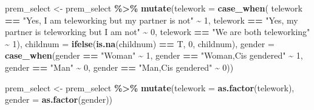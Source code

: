 \documentclass[
]{article}
\newenvironment{Shaded}{\begin{snugshade}}{\end{snugshade}}
\newcommand{\DataTypeTok}[1]{\textcolor[rgb]{0.13,0.29,0.53}{#1}}
\newcommand{\DecValTok}[1]{\textcolor[rgb]{0.00,0.00,0.81}{#1}}
\newcommand{\KeywordTok}[1]{\textcolor[rgb]{0.13,0.29,0.53}{\textbf{#1}}}
\newcommand{\NormalTok}[1]{#1}
\newcommand{\OperatorTok}[1]{\textcolor[rgb]{0.81,0.36,0.00}{\textbf{#1}}}
\newcommand{\StringTok}[1]{\textcolor[rgb]{0.31,0.60,0.02}{#1}}
\begin{document}
\begin{Shaded}
\begin{Highlighting}[]
\NormalTok{prem\_select \textless{}{-}}\StringTok{ }\NormalTok{prem\_select }\OperatorTok{\%\textgreater{}\%}
\StringTok{  }\KeywordTok{mutate}\NormalTok{(}\DataTypeTok{telework =} \KeywordTok{case\_when}\NormalTok{(}
\NormalTok{    telework }\OperatorTok{==}\StringTok{ "Yes, I am teleworking but my partner is not"} \OperatorTok{\textasciitilde{}}\StringTok{ }\DecValTok{1}\NormalTok{,}
\NormalTok{    telework }\OperatorTok{==}\StringTok{ "Yes, my partner is teleworking but I am not"} \OperatorTok{\textasciitilde{}}\StringTok{ }\DecValTok{0}\NormalTok{,}
\NormalTok{    telework }\OperatorTok{==}\StringTok{ "We are both teleworking"} \OperatorTok{\textasciitilde{}}\StringTok{ }\DecValTok{1}\NormalTok{),}
    \DataTypeTok{childnum =} \KeywordTok{ifelse}\NormalTok{(}\KeywordTok{is.na}\NormalTok{(childnum) }\OperatorTok{==}\StringTok{ }\NormalTok{T, }\DecValTok{0}\NormalTok{, childnum),}
    \DataTypeTok{gender =} \KeywordTok{case\_when}\NormalTok{(gender }\OperatorTok{==}\StringTok{ "Woman"} \OperatorTok{\textasciitilde{}}\StringTok{ }\DecValTok{1}\NormalTok{,}
\NormalTok{                       gender }\OperatorTok{==}\StringTok{ "Woman,Cis gendered"} \OperatorTok{\textasciitilde{}}\StringTok{ }\DecValTok{1}\NormalTok{,}
\NormalTok{                       gender }\OperatorTok{==}\StringTok{ "Man"} \OperatorTok{\textasciitilde{}}\StringTok{ }\DecValTok{0}\NormalTok{,}
\NormalTok{                       gender }\OperatorTok{==}\StringTok{ "Man,Cis gendered"} \OperatorTok{\textasciitilde{}}\StringTok{ }\DecValTok{0}\NormalTok{))}
\end{Highlighting}
\end{Shaded}

\begin{Shaded}
\begin{Highlighting}[]
\NormalTok{prem\_select \textless{}{-}}\StringTok{ }\NormalTok{prem\_select }\OperatorTok{\%\textgreater{}\%}
\StringTok{  }\KeywordTok{mutate}\NormalTok{(}\DataTypeTok{telework =} \KeywordTok{as.factor}\NormalTok{(telework),}
         \DataTypeTok{gender =} \KeywordTok{as.factor}\NormalTok{(gender))}
\end{Highlighting}
\end{Shaded}
\end{document}

